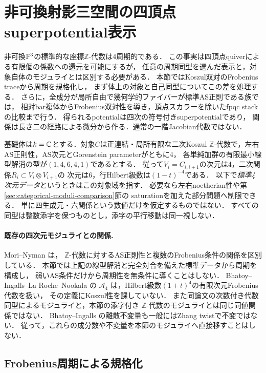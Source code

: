\section{非可換射影三空間の四頂点superpotential表示}
\label{sec:projective-three-potentials}

非可換$\mathbb P^3$の標準的な座標$\mathbb Z$-代数は4周期的である．
この事実は四頂点quiverによる有限個の係数への還元を可能にするが，
任意の周期同型を選んだ表示と，対象自体のモジュライとは区別する必要がある．
本節ではKoszul双対のFrobenius traceから周期を規格化し，
まず体上の対象と自己同型についてこの差を処理する．
さらに，全成分が局所自由で幾何学的ファイバーが標準AS正則である族では，
相対bar複体からFrobenius双対性を導き，頂点スカラーを除いたfpqc stackの比較まで行う．
得られるpotentialは四次の符号付きsuperpotentialであり，
関係は長さ二の経路による微分から作る．通常の一階Jacobian代数ではない．

基礎体は$k=\mathbb C$とする．対象$C$は正連結・局所有限な二次Koszul
$\mathbb Z$-代数で，左右AS正則性，AS次元とGorenstein parameterがともに4，
各単純加群の有限最小線型解消の型が$(1,4,6,4,1)$であるとする．
従って$V_i=C_{i,i+1}$の次元は4，二次関係$R_i\subset V_i\otimes V_{i+1}$の
次元は6，行Hilbert級数は$(1-t)^{-4}$である．
以下で\emph{標準4次元データ}というときはこの対象域を指す．
必要なら左右noetherian性や第\ref{sec:categorical-moduli-comparison}節の
saturationを加えた部分問題へ制限できる．
単に四生成元・六関係という数値だけを仮定するものではない．
すべての同型は整数添字を保つものとし，添字の平行移動は同一視しない．

\paragraph{既存の四次元モジュライとの関係.}
Mori--Nyman \cite[Theorem~4.19]{MoriNymanZ} は，
$\mathbb Z$-代数に対するAS正則性と複数のFrobenius条件の関係を区別している．
本節では上記の線型解消と完全対合を備えた標準データから周期を構成し，
弱いAS条件だけから周期性を無条件に導くことはしない．
Bhatoy--Ingalls--La Roche--Nookala \cite{BILNComponents} の
$\mathcal A_4$ は，Hilbert級数$(1+t)^4$の有限次元Frobenius代数を扱い，
その定義にKoszul性を課していない．
また同論文の次数付き代数同型によるモジュライと，本節の添字付き
$\mathbb Z$-代数のモジュライとは同じ同値関係ではない．
Bhatoy--Ingalls \cite{BIDiscrete} の離散不変量も一般にはZhang twistで不変ではない．
従って，これらの成分数や不変量を本節のモジュライへ直接移すことはしない．

\subsection{Frobenius周期による規格化}

